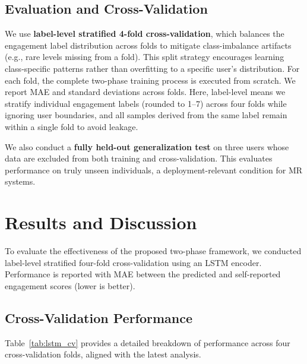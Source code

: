 \documentclass[review]{vgtc}                 %
\begin{document}
\subsection{Evaluation and Cross-Validation}
 We use \textbf{label-level stratified 4-fold cross-validation}, which balances the engagement label distribution across folds to mitigate class-imbalance artifacts (e.g., rare levels missing from a fold).  This split strategy encourages learning class-specific patterns rather than overfitting to a specific user's distribution. For each fold, the complete two-phase training process is executed from scratch. We report MAE and standard deviations across folds. Here, label-level means we stratify individual engagement labels (rounded to 1--7) across four folds while ignoring user boundaries, and all samples derived from the same label remain within a single fold to avoid leakage.

We also conduct a \textbf{fully held-out generalization test} on three users whose data are excluded from both training and cross-validation. This evaluates performance on truly unseen individuals, a deployment-relevant condition for MR systems.

\section{Results and Discussion}

To evaluate the effectiveness of the proposed two-phase framework, we conducted label-level stratified four-fold cross-validation using an LSTM encoder. Performance is reported with MAE between the predicted and self-reported engagement scores (lower is better).

\subsection{Cross-Validation Performance}
Table~\ref{tab:lstm_cv} provides a detailed breakdown of performance across four cross-validation folds, aligned with the latest analysis.
\end{document}

